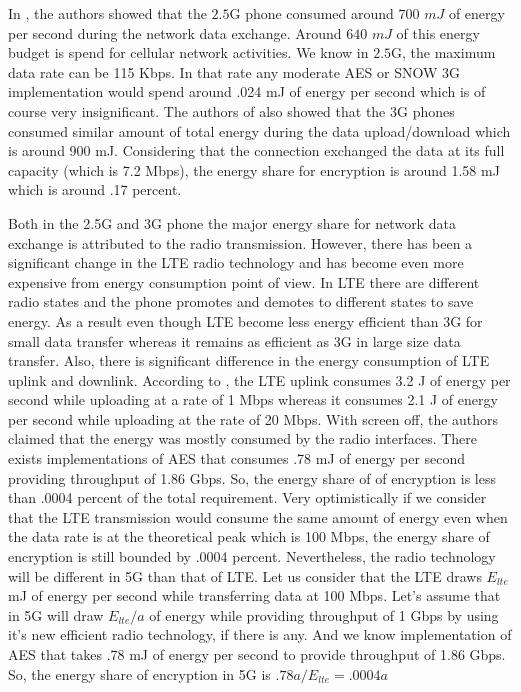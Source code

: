 In \cite{Usenix_2010}, the authors showed that the $2.5$G phone consumed around $700$ $mJ$ of energy per second during the network data exchange. Around $640$ $mJ$ of this energy budget is spend for cellular network activities. We know in $2.5$G, the maximum data rate can be 115 Kbps. In that rate any moderate AES or SNOW 3G implementation would spend around .024 mJ of energy per second which is of course very insignificant. The authors of \cite{Usenix_2010} also showed that the 3G phones consumed similar amount of total energy during the data upload/download which is around 900 mJ. Considering that the connection exchanged the data at its full capacity (which is 7.2 Mbps), the energy share for encryption is around 1.58 mJ which is around .17 percent. 

Both in the 2.5G and 3G phone the major energy share for network data exchange is attributed to the radio transmission. However, there has been a significant change in the LTE radio technology and has become even more expensive from energy consumption point of view. In LTE there are different radio states and the phone promotes and demotes to different states to save energy. As a result even though LTE become less energy efficient than 3G for small data transfer whereas it remains as efficient as 3G in large size data transfer. Also, there is significant difference in the energy consumption of LTE uplink and downlink. According to \cite{Mobisys_2012}, the LTE uplink consumes 3.2 J of energy per second while uploading at a rate of 1 Mbps whereas it consumes 2.1 J of energy per second while uploading at the rate of 20 Mbps. With screen off, the authors claimed that the energy was mostly consumed by the radio interfaces. There exists implementations of AES that consumes .78 mJ of energy per second providing throughput of 1.86 Gbps. So, the energy share of of encryption is less than .0004 percent of the total requirement. Very optimistically if we consider that the LTE transmission would consume the same amount of energy even when the data rate is at the theoretical peak which is 100 Mbps, the energy share of encryption is still bounded by .0004 percent. Nevertheless, the radio technology will be different in 5G than that of LTE. Let us consider that the LTE draws $E_{lte}$ mJ of energy per second while transferring data at 100 Mbps. Let's assume that in 5G will draw $E_{lte}/a$ of energy while providing throughput of 1 Gbps by using it's new efficient radio technology, if there is any. And we know implementation of AES that takes .78 mJ of energy per second to provide throughput of 1.86 Gbps. So, the energy share of encryption in 5G is $.78a/E_{lte} = .0004a$





